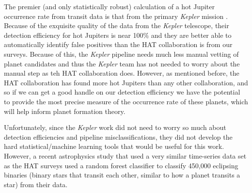 The premier (and only statistically robust) calculation of a hot Jupiter occurrence rate from transit data is that from the primary {\it Kepler} mission \cite{howard2012}.  Because of the exquisite quality of the data from the {\it Kepler} telescope, their detection efficiency for hot Jupiters is near 100\% and they are better able to automatically identify false positives than the HAT collaboration is from our surveys.  Because of this, the {\it Kepler} pipeline needs much less manual vetting of planet candidates and thus the {\it Kepler} team has not needed to worry about the manual step as teh HAT collaboration does.  However, as mentioned before, the HAT collaboration has found more hot Jupiters than any other collaboration, and so if we can get a good handle on our detection efficiency we have the potential to provide the most precise measure of the occurrence rate of these planets, which will help inform planet formation theory.

Unfortunately, since the {\it Kepler} work did not need to worry so much about detection efficiencies and pipeline misclassifications, they did not develop the hard statistical/machine learning tools that would be useful for this work.  However, a recent astrophysics study \cite{ogle2017} that used a very similar time-series data set as the HAT surveys used a random forest classifier to classify 450,000 eclipsing binaries (binary stars that transit each other, similar to how a planet transits a star) from their data.